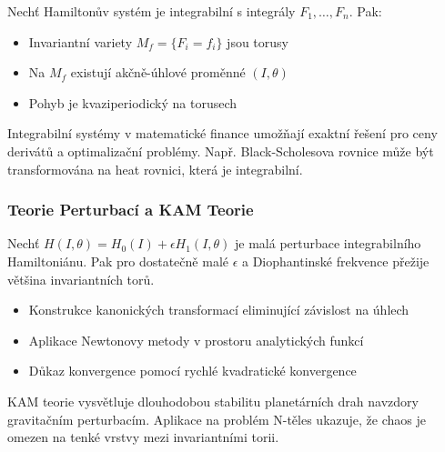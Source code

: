 \begin{theorem}
Nechť Hamiltonův systém je integrabilní s integrály $F_1, \dots, F_n$. Pak:
\begin{itemize}
\item Invariantní variety $M_f = \{F_i = f_i\}$ jsou torusy
\item Na $M_f$ existují akčně-úhlové proměnné $(I, \theta)$
\item Pohyb je kvaziperiodický na torusech
\end{itemize}
\end{theorem}

\begin{application}
Integrabilní systémy v matematické finance umožňají exaktní řešení pro ceny derivátů a optimalizační problémy. Např. Black-Scholesova rovnice může být transformována na heat rovnici, která je integrabilní.
\end{application}

\subsubsection{Teorie Perturbací a KAM Teorie}

\begin{theorem}
Nechť $H(I, \theta) = H_0(I) + \epsilon H_1(I, \theta)$ je malá perturbace integrabilního Hamiltoniánu. Pak pro dostatečně malé $\epsilon$ a Diophantinské frekvence přežije většina invariantních torů.
\end{theorem}

\begin{proofsketch}
\begin{itemize}
\item Konstrukce kanonických transformací eliminující závislost na úhlech
\item Aplikace Newtonovy metody v prostoru analytických funkcí
\item Důkaz konvergence pomocí rychlé kvadratické konvergence
\end{itemize}
\end{proofsketch}

\begin{application}
KAM teorie vysvětluje dlouhodobou stabilitu planetárních drah navzdory gravitačním perturbacím. Aplikace na problém N-těles ukazuje, že chaos je omezen na tenké vrstvy mezi invariantními torii.
\end{application}

